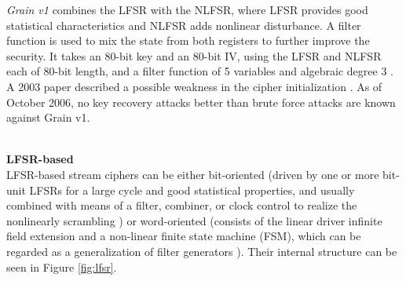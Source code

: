 \emph{Grain v1} combines the LFSR with the NLFSR, where LFSR provides good statistical characteristics and NLFSR adds nonlinear disturbance. A filter function is used to mix the state from both registers to further improve the security. It takes an 80-bit key and an 80-bit IV, using the LFSR and NLFSR each of 80-bit length, and a filter function of 5 variables and algebraic degree 3 \cite{hell2007grain}. A 2003 paper described a possible weakness in the cipher initialization \cite{kuccuk2006slide}. As of October 2006, no key recovery attacks better than brute force attacks are known against Grain v1. \\\\

\clearpage

\textbf{LFSR-based} \\

LFSR-based stream ciphers can be either bit-oriented (driven by one or more bit-unit LFSRs for a large cycle and good statistical properties, and usually combined with means of a filter, combiner, or clock control to realize the nonlinearly scrambling \cite{jiao2020stream}) or word-oriented (consists of the linear driver infinite field extension and a non-linear finite state machine (FSM), which can be regarded as a generalization of filter generators \cite{jiao2020stream}). Their internal structure can be seen in Figure \ref{fig:lfsr}.

